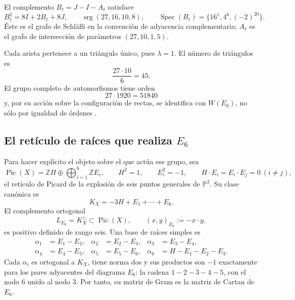 El complemento \(B_\ell=J-I-A_\ell\) satisface
\begin{equation}
 B_\ell^2=8I+2B_\ell+8J,
 \qquad
 \operatorname{srg}(27,16,10,8),
 \qquad
 \operatorname{Spec}(B_\ell)=\{16^1,4^6,(-2)^{20}\}.
 \label{x_reciprocidad:p12-83-c20-s6:eq:complemento-schlafli}
\end{equation}
Éste es el grafo de Schläfli en la convención de adyacencia complementaria;
\(A_\ell\) es el grafo de intersección de parámetros
\((27,10,1,5)\).

Cada arista pertenece a un triángulo único, pues \(\lambda=1\). El número
de triángulos es
\[
 \frac{27\cdot10}{6}=45.
\]
El grupo completo de automorfismos tiene orden
\[
 27\cdot1920=51840
\]
y, por su acción sobre la configuración de rectas, se identifica con
\(W(E_6)\), no sólo por igualdad de órdenes \cite{x_reciprocidad:Manivel2005}.

\subsection{El retículo de raíces que realiza \texorpdfstring{\(E_6\)}{E6}}

Para hacer explícito el objeto sobre el que actúa ese grupo, sea
\begin{equation}
 \operatorname{Pic}(X)
 =\mathbb ZH\oplus\bigoplus_{i=1}^6\mathbb ZE_i,
 \qquad
 H^2=1,\qquad E_i^2=-1,\qquad H\cdot E_i=E_i\cdot E_j=0\ (i\ne j),
 \label{x_reciprocidad:p12-83-c20-s6:eq:picard-cubica-e6}
\end{equation}
el retículo de Picard de la explosión de seis puntos generales de
\(\mathbb P^2\). Su clase canónica es
\[
 K_X=-3H+E_1+\cdots+E_6.
\]
El complemento ortogonal
\begin{equation}
 L_{E_6}=K_X^\perp\subset\operatorname{Pic}(X),
 \qquad (x,y)_{E_6}:=-x\cdot y,
 \label{x_reciprocidad:p12-83-c20-s6:eq:reticulo-raices-e6}
\end{equation}
es positivo definido de rango seis. Una base de raíces simples es
\begin{equation}
 \begin{aligned}
 \alpha_1&=E_1-E_2,& \alpha_2&=E_2-E_3,&
 \alpha_3&=E_3-E_4,\\
 \alpha_4&=E_4-E_5,& \alpha_5&=E_5-E_6,&
 \alpha_6&=H-E_1-E_2-E_3.
 \end{aligned}
 \label{x_reciprocidad:p12-83-c20-s6:eq:raices-simples-e6}
\end{equation}
Cada \(\alpha_i\) es ortogonal a \(K_X\), tiene norma dos y sus productos
son \(-1\) exactamente para los pares adyacentes del diagrama
\(E_6\): la cadena \(1-2-3-4-5\), con el nodo \(6\) unido al nodo \(3\).
Por tanto, su matriz de Gram es la matriz de Cartan de \(E_6\).

